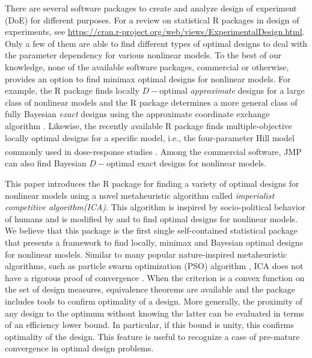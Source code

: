 There are several software packages to  create and analyze  design of experiment (DoE) for different purposes.  For a review on statistical R packages in design of experiments, see  \url{https://cran.r-project.org/web/views/ExperimentalDesign.html}.  Only a few of them are able to  find different types of optimal designs   to deal with the parameter dependency for various nonlinear models.
To the best of our knowledge, none of the available software packages, commercial or otherwise, provides an option to  find  minimax optimal designs for nonlinear models.
For example,  the R package  \citep{masoudi2013}   finds locally $D-$optimal {\it approximate} designs for a large class of nonlinear models
and the  R package \citep{overstall2017acebayes} determines a more general class of fully  Bayesian {\it exact} designs  using  the approximate coordinate exchange algorithm \citep{overstall2017bayesian}. Likewise, the recently available
 R package  finds multiple-objective locally optimal designs for a specific model, i.e., the four-parameter Hill model commonly used in dose-response studies \citep{VNM-JSS}.
Among the commercial software, JMP\textsuperscript{\textregistered} \citep{jmp13-design}  can also find Bayesian $D-$optimal exact designs for nonlinear models.

This paper introduces the R package  \citep{ICAOD2020} for finding a variety of  optimal designs for nonlinear models using  a novel metaheuristic algorithm called   {\it imperialist competitive algorithm(ICA)}.
This algorithm  is inspired by  socio-political behavior of humans \citep{ica2007, hosseini2014} and is modified by \citet{masoudi2017} and \citet{masoudi2019} to find optimal designs for nonlinear models.
We believe that this  package  is the first single self-contained statistical package  that presents  a framework to find   locally, minimax and Bayesian optimal designs for nonlinear models.
Similar to many   popular nature-inspired metaheuristic algorithms, such as particle swarm optimization (PSO) algorithm \citep{Kennedy1995},   ICA  does not have a rigorous  proof of convergence \citep{yang2011metaheuristic}.  When the criterion is a convex function on the set of design measures, equivalence theorems are available  and the  package includes tools    to confirm optimality of a design.  More generally,  the proximity of any  design to the optimum without knowing the latter can be evaluated in terms of an  efficiency lower bound. In particular, if this bound is unity, this confirms optimality of the design. This feature is  useful to  recognize a case of  pre-mature convergence in optimal design problems.


